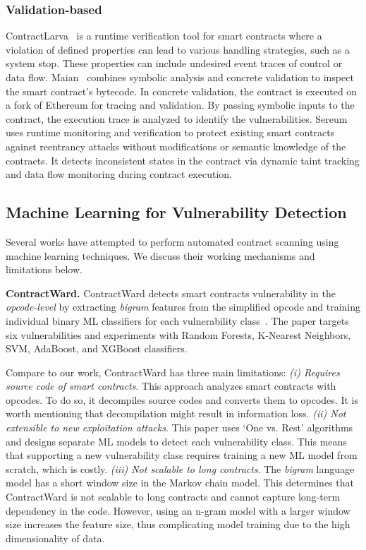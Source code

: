 \subsubsection{Validation-based}  ContractLarva~\cite{rw_contractlarva_paper} is a runtime verification tool for smart contracts where a violation of defined properties can lead to various handling strategies, such as a system stop. These properties can include undesired event traces of control or data flow. 
Maian~\cite{rw_maian_paper,rw_maian_repo} combines symbolic analysis and concrete validation to inspect the smart contract's bytecode. In concrete validation, the contract is executed on a fork of Ethereum for tracing and validation. By passing symbolic inputs to the contract, the execution trace is analyzed to identify the vulnerabilities.
Sereum~\cite{rodler2018sereum} uses runtime monitoring and verification to protect existing smart contracts against reentrancy attacks without modifications or semantic knowledge of the contracts. 
It detects inconsistent states in the contract via dynamic taint tracking and data flow monitoring during contract execution. %

\vspace{-1.2em}
\subsection{Machine Learning for Vulnerability Detection}
Several works have attempted to perform automated contract scanning using machine learning techniques. We discuss their working mechanisms and limitations below.

\vspace{0.2em}
\textbf{ContractWard.}
ContractWard detects smart contracts vulnerability in the \textit{opcode-level} by extracting \textit{bigram} features from the simplified opcode and training individual binary ML classifiers for each vulnerability class~\cite{rw_contractward}. The paper targets six vulnerabilities and experiments with Random Forests, K-Nearest Neighbors, SVM, AdaBoost, and XGBoost classifiers. 

Compare to our work, ContractWard has three main limitations:
\textit{(i) Requires source code of smart contracts}. This approach analyzes smart contracts with opcodes. To do so, it decompiles source codes and converts them to opcodes. It is worth mentioning that decompilation might result in information loss. \textit{(ii) Not extensible to new exploitation attacks}. This paper uses `One vs. Rest' algorithms and designs separate ML models to detect each vulnerability class. This means that supporting a new vulnerability class requires training a new ML model from scratch, which is costly.  
\textit{(iii) Not scalable to long contracts}. The \textit{bigram} language model has a short window size in the Markov chain model. This determines that ContractWard is not scalable to long contracts and cannot capture long-term dependency in the code. However, using an n-gram model with a larger window size increases the feature size, thus complicating model training due to the high dimensionality of data.

